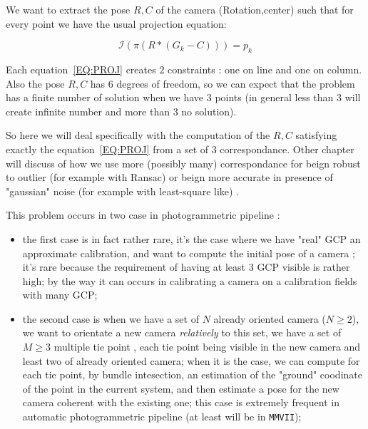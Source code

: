 We want to extract the pose $R,C$ of the camera (Rotation,center) such that for every point
we have the usual projection equation:

\begin{equation}
       \mathcal I(\pi (R*(G_k-C))) = p_k \label{EQ:PROJ}
\end{equation}


Each equation~\ref{EQ:PROJ}  creates $2$ constraints : one on line and one on column.
Also the pose $R,C$ has $6$ degrees of freedom, so we can expect that the problem has
a finite number of solution when we have $3$ points (in general less than $3$ will create
infinite number and more than $3$ no solution).

So here we will deal specifically  with the computation of the $R,C$ satisfying
exactly the equation~\ref{EQ:PROJ}  from a set of $3$ correspondance. Other
chapter will discuss of how we use more (possibly many) correspondance for beign 
robust to outlier (for
example with Ransac) or beign more accurate in presence of "gaussian" noise (for 
example with least-square like) .


This problem occurs in two case in photogrammetric pipeline :

\begin{itemize}
   \item the first case is in fact rather rare, it's the case where we have "real" GCP
         an approximate calibration, and want to compute the initial pose of a camera ;
         it's rare because the requirement of having at least $3$ GCP visible is rather
         high; by the way it can occurs in calibrating a camera on a calibration fields
         with many GCP;

 \item the second case is when we have a set of $N$ already oriented camera  ($N\geq 2 $),
       we want to orientate a new camera \emph{relatively} to this set, we have a
       set of $M \geq 3$ multiple tie point , each tie point being visible in the new
       camera and least two of already oriented camera;  when it is the case,
       we can compute for each tie point, by bundle intesection, an estimation of the
       "ground" coodinate of the point in the current system, and then estimate a pose
       for the new camera coherent with the existing one;
       this case is extremely frequent in automatic photogrammetric
       pipeline (at least will be in {\tt MMVII});

\end{itemize}

